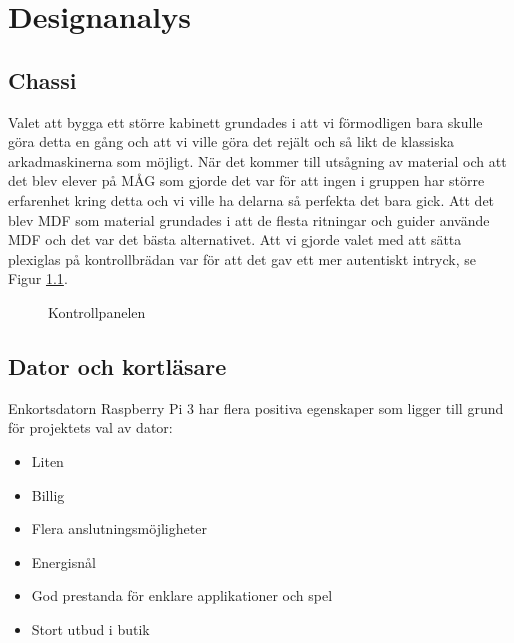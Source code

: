 \documentclass[12pt,fleqn,openany]{book} %
\begin{document}
\chapter{Designanalys}


\section{Chassi}
Valet att bygga ett större kabinett grundades i att vi förmodligen bara skulle göra detta en gång och att vi ville göra det 
rejält och så likt de klassiska arkadmaskinerna som möjligt. När det kommer till utsågning av material och att det blev elever 
på MÅG som gjorde det var för att ingen i gruppen har större erfarenhet kring detta och vi ville ha delarna så perfekta det 
bara gick. Att det blev MDF som material grundades i att de flesta ritningar och guider använde MDF och det var det bästa 
alternativet. Att vi gjorde valet med att sätta plexiglas på kontrollbrädan var för att det gav ett mer autentiskt intryck, se Figur \ref{fig_kontrollpanel}. 

\begin{figure}[h]
\centering{}
\caption{Kontrollpanelen}
\label{fig_kontrollpanel}
\end{figure}

\section{Dator och kortläsare}
Enkortsdatorn Raspberry Pi 3 har flera positiva egenskaper som ligger till grund för projektets val av dator:

\begin{itemize}
 \item Liten
 \item Billig
 \item Flera anslutningsmöjligheter
 \item Energisnål
 \item God prestanda för enklare applikationer och spel
 \item Stort utbud i butik
\end{itemize}
\bigskip
\end{document}
